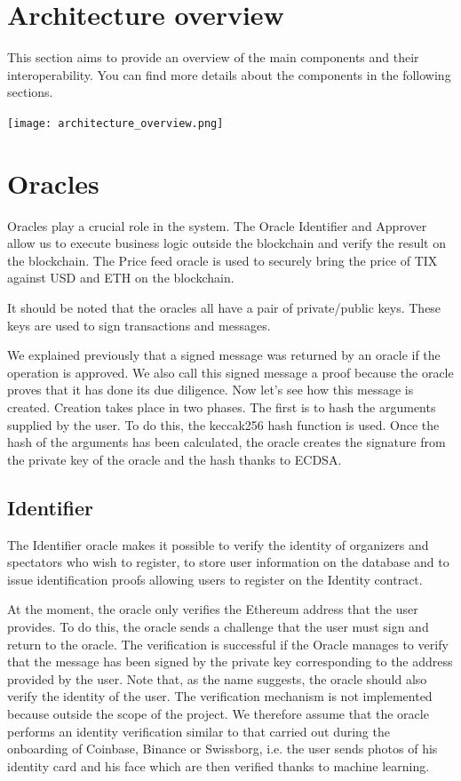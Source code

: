 \documentclass[a4paper,11pt,oneside]{report}
\begin{document}
\section{Architecture overview}
This section aims to provide an overview of the main components and their interoperability. You can find more details about the components in the following sections.

\texttt{[image: architecture\_overview.png]}

\section{Oracles}
Oracles play a crucial role in the system. The Oracle Identifier and Approver allow us to execute business logic outside the blockchain and verify the result on the blockchain. The Price feed oracle is used to securely bring the price of TIX against USD and ETH on the blockchain.

It should be noted that the oracles all have a pair of private/public keys. These keys are used to sign transactions and messages.

We explained previously that a signed message was returned by an oracle if the operation is approved. We also call this signed message a proof because the oracle proves that it has done its due diligence. Now let's see how this message is created. Creation takes place in two phases. The first is to hash the arguments supplied by the user. To do this, the keccak256 hash function is used. Once the hash of the arguments has been calculated, the oracle creates the signature from the private key of the oracle and the hash thanks to ECDSA.

\subsection{Identifier}
The Identifier oracle makes it possible to verify the identity of organizers and spectators who wish to register, to store user information on the database and to issue identification proofs allowing users to register on the Identity contract.

At the moment, the oracle only verifies the Ethereum address that the user provides. To do this, the oracle sends a challenge that the user must sign and return to the oracle. The verification is successful if the Oracle manages to verify that the message has been signed by the private key corresponding to the address provided by the user. Note that, as the name suggests, the oracle should also verify the identity of the user. The verification mechanism is not implemented because outside the scope of the project. We therefore assume that the oracle performs an identity verification similar to that carried out during the onboarding of Coinbase, Binance or Swissborg, i.e. the user sends photos of his identity card and his face which are then verified thanks to machine learning.
\end{document}
